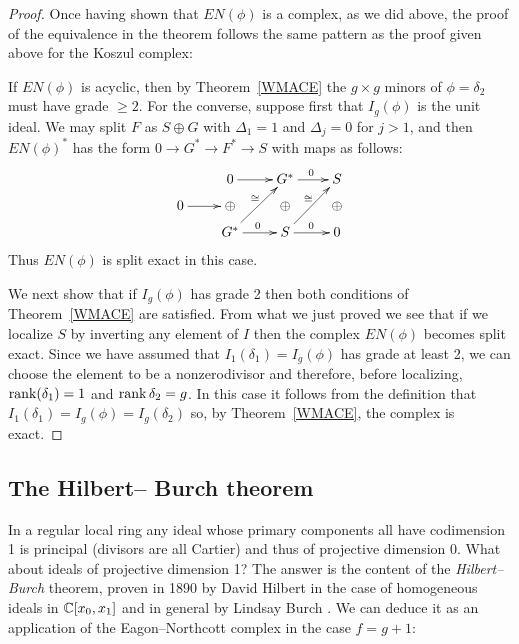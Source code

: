 \begin{proof}
Once having shown that $EN(\phi)$ is a complex, as we did above,  the
proof of the equivalence in the theorem follows the same pattern as the
proof given above for the Koszul complex:
%

If $EN(\phi)$ is acyclic, then by Theorem~\ref{WMACE} the $g\times g$
minors of $\phi = \delta_{2}$ must
have grade $\geq 2$.
For the converse, suppose first that
$I_{g}(\phi)$ is the
unit ideal. We may split  $F$ as  $S\oplus G$ with $\Delta_{1} = 1$
and $\Delta_{j} = 0$
for $j>1$, and then $EN(\phi)^{*}$ has the form
$0\to G^{*} \to F^{*} \to S$ with maps 
as follows:
\vspace*{-3pt}
$$
\xymatrix@C=21pt@R=6pt{&0\ar[r]&G^*\ar[r]^0&S\\
0\ar[r]&\oplus&\oplus&\oplus\\
&G^*\ar[r]^0\ar[uur]^{\cong\!\!\!}&S\ar[r]^0\ar[uur]^{\cong\!\!\!}&0}
$$
Thus 
$EN(\phi)$ is split exact in this case.

We next show that if $I_{g}(\phi)$ has grade 2 then both conditions of
Theorem~\ref{WMACE} are
satisfied.
From what we just proved we see that
if we localize
$S$ by inverting any element of $I$ then the complex $EN(\phi)$ becomes
split exact. Since we have assumed that $I_1(\delta_1) = I_g(\phi)$ has grade at least 2,
we can choose the element to be a nonzerodivisor
%
and therefore, before localizing,
$\rank(\delta_{1}) = 1$ and $\rank \delta_{2} = g$. In this
case it follows from the definition that $I_{1}(\delta_{1}) = I_{g}(\phi)
= I_{g}(\delta_{2})$
so, by Theorem~\ref{WMACE}, the complex is exact. \end{proof}

\subsection*{The Hilbert--\kern-0.5pt Burch theorem}

\hskip-3pt
In a regular local ring any ideal whose primary components all have 
\null codimension\kern1.5pt 1 is 
principal (divisors are all Cartier) and thus of projective dimension 0. What about
ideals of projective dimension 1? The answer is the content of the
\emph{Hilbert--Burch} theorem, proven
in 1890 by David Hilbert in the case of homogeneous ideals in
%
%
$\CC[x_{0},x_{1}]$ and in general by
Lindsay Burch \citeyear{MR212008}. We can deduce it as an application of
the Eagon--Northcott complex
in the case $f =g+1$:

